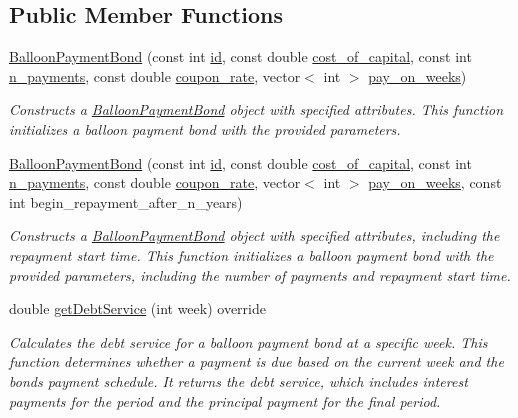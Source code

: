 \subsection*{Public Member Functions}
\begin{DoxyCompactItemize}
\item 
\mbox{\hyperlink{classBalloonPaymentBond_a03b25124896e67f851a35721c37705fe}{Balloon\+Payment\+Bond}} (const int \mbox{\hyperlink{classBond_a7f75bcafbc16676ad6dbafbf40afae4a}{id}}, const double \mbox{\hyperlink{classBond_ad98df7d28b398e620286f95ee085439b}{cost\+\_\+of\+\_\+capital}}, const int \mbox{\hyperlink{classBond_a4a227b6de2eeada118d82ab1633b1db8}{n\+\_\+payments}}, const double \mbox{\hyperlink{classBond_a5f66785534e24caa43d9f730130a6463}{coupon\+\_\+rate}}, vector$<$ int $>$ \mbox{\hyperlink{classBond_ae8dd46fcbf95c993460ffe4ea1f52739}{pay\+\_\+on\+\_\+weeks}})
\begin{DoxyCompactList}\small\item\em Constructs a \mbox{\hyperlink{classBalloonPaymentBond}{Balloon\+Payment\+Bond}} object with specified attributes. This function initializes a balloon payment bond with the provided parameters. \end{DoxyCompactList}\item 
\mbox{\hyperlink{classBalloonPaymentBond_afc8bb53b6642dac9811414b447279e5b}{Balloon\+Payment\+Bond}} (const int \mbox{\hyperlink{classBond_a7f75bcafbc16676ad6dbafbf40afae4a}{id}}, const double \mbox{\hyperlink{classBond_ad98df7d28b398e620286f95ee085439b}{cost\+\_\+of\+\_\+capital}}, const int \mbox{\hyperlink{classBond_a4a227b6de2eeada118d82ab1633b1db8}{n\+\_\+payments}}, const double \mbox{\hyperlink{classBond_a5f66785534e24caa43d9f730130a6463}{coupon\+\_\+rate}}, vector$<$ int $>$ \mbox{\hyperlink{classBond_ae8dd46fcbf95c993460ffe4ea1f52739}{pay\+\_\+on\+\_\+weeks}}, const int begin\+\_\+repayment\+\_\+after\+\_\+n\+\_\+years)
\begin{DoxyCompactList}\small\item\em Constructs a \mbox{\hyperlink{classBalloonPaymentBond}{Balloon\+Payment\+Bond}} object with specified attributes, including the repayment start time. This function initializes a balloon payment bond with the provided parameters, including the number of payments and repayment start time. \end{DoxyCompactList}\item 
double \mbox{\hyperlink{classBalloonPaymentBond_a8648a2ae688f90a3b2e6689711c22b9d}{get\+Debt\+Service}} (int week) override
\begin{DoxyCompactList}\small\item\em Calculates the debt service for a balloon payment bond at a specific week. This function determines whether a payment is due based on the current week and the bond\textquotesingle{}s payment schedule. It returns the debt service, which includes interest payments for the period and the principal payment for the final period. \end{DoxyCompactList}\item 

\end{DoxyCompactItemize}
